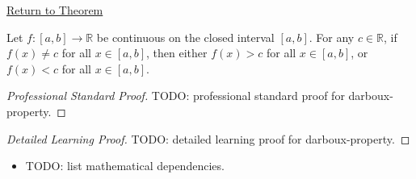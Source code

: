\newpage
{}
\label{prf:darboux-property}

\begin{remark*}[Return]
\hyperref[thm:darboux-property]{Return to Theorem}
\end{remark*}

\begin{theorem*}
Let $f : [a, b] \to \mathbb{R}$ be continuous on the closed interval $[a, b]$. For any $c \in \mathbb{R}$, if $f(x) \neq c$ for all $x \in [a, b]$, then either $f(x) > c$ for all $x \in [a, b]$, or $f(x) < c$ for all $x \in [a, b]$.
\end{theorem*}

\begin{proof}[Professional Standard Proof]
\LRAProofBodyStart
TODO: professional standard proof for darboux-property.
\end{proof}

\begin{proof}[Detailed Learning Proof]
\LRAProofBodyStart
TODO: detailed learning proof for darboux-property.
\end{proof}

\begin{remark*}
\end{remark*}

\begin{dependencies}
\begin{itemize}
  \item TODO: list mathematical dependencies.
\end{itemize}
\end{dependencies}

\clearpage
